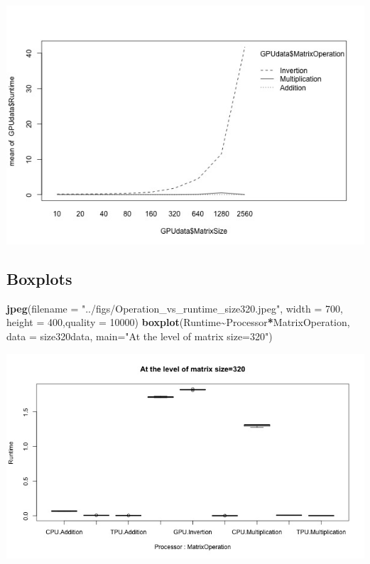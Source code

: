 \documentclass[
]{article}
\newenvironment{Shaded}{\begin{snugshade}}{\end{snugshade}}
\newcommand{\DataTypeTok}[1]{\textcolor[rgb]{0.13,0.29,0.53}{#1}}
\newcommand{\DecValTok}[1]{\textcolor[rgb]{0.00,0.00,0.81}{#1}}
\newcommand{\KeywordTok}[1]{\textcolor[rgb]{0.13,0.29,0.53}{\textbf{#1}}}
\newcommand{\NormalTok}[1]{#1}
\newcommand{\OperatorTok}[1]{\textcolor[rgb]{0.81,0.36,0.00}{\textbf{#1}}}
\newcommand{\StringTok}[1]{\textcolor[rgb]{0.31,0.60,0.02}{#1}}
\begin{document}
\begin{center}\includegraphics[width=0.9\linewidth]{../figs/interaction_GPU_size_time} \end{center}

\hypertarget{boxplots}{%
\subsection{Boxplots}\label{boxplots}}

\begin{Shaded}
\begin{Highlighting}[]
\KeywordTok{jpeg}\NormalTok{(}\DataTypeTok{filename =} \StringTok{"../figs/Operation\_vs\_runtime\_size320.jpeg"}\NormalTok{, }\DataTypeTok{width =} \DecValTok{700}\NormalTok{, }\DataTypeTok{height =} \DecValTok{400}\NormalTok{,}\DataTypeTok{quality =} \DecValTok{10000}\NormalTok{)}
\KeywordTok{boxplot}\NormalTok{(Runtime}\OperatorTok{\textasciitilde{}}\NormalTok{Processor}\OperatorTok{*}\NormalTok{MatrixOperation, }\DataTypeTok{data =}\NormalTok{ size320data, }\DataTypeTok{main=}\StringTok{"At the level of matrix size=320"}\NormalTok{)}
\end{Highlighting}
\end{Shaded}

\begin{center}\includegraphics[width=0.9\linewidth]{../figs/Operation_vs_runtime_size320} \end{center}
\end{document}
